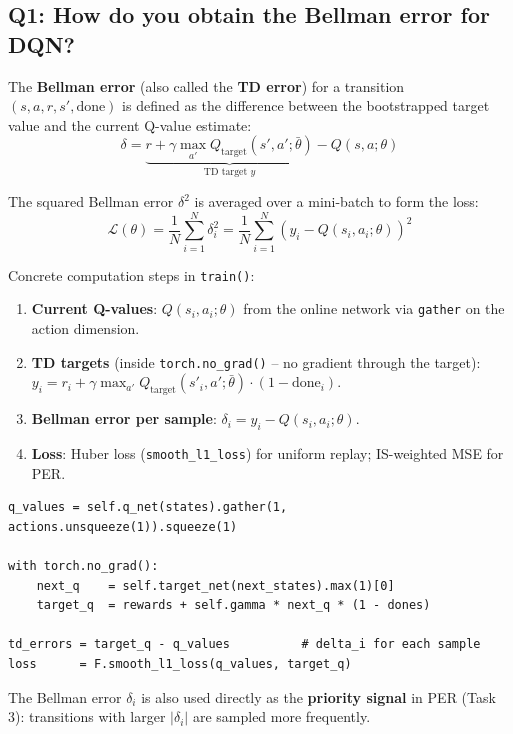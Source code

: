 \documentclass[12pt, a4paper]{report}
\begin{document}
\subsection*{Q1: How do you obtain the Bellman error for DQN?}

The \textbf{Bellman error} (also called the \textbf{TD error}) for a transition $(s,a,r,s',\text{done})$
is defined as the difference between the bootstrapped target value and the current Q-value estimate:
\[
  \delta = \underbrace{r + \gamma \max_{a'} Q_\text{target}(s',a';\bar{\theta})}_{\text{TD target }y}
           - Q(s,a;\theta)
\]

The squared Bellman error $\delta^2$ is averaged over a mini-batch to form the loss:
\[
  \mathcal{L}(\theta) = \frac{1}{N}\sum_{i=1}^{N}\delta_i^2
  = \frac{1}{N}\sum_{i=1}^{N}\!\left(y_i - Q(s_i,a_i;\theta)\right)^2
\]

Concrete computation steps in \texttt{train()}:
\begin{enumerate}
  \item \textbf{Current Q-values}: $Q(s_i,a_i;\theta)$ from the online network via \texttt{gather}
        on the action dimension.
  \item \textbf{TD targets} (inside \texttt{torch.no\_grad()} -- no gradient through the target):
        $y_i = r_i + \gamma \max_{a'} Q_\text{target}(s'_i,a';\bar{\theta})\cdot(1-\text{done}_i)$.
  \item \textbf{Bellman error per sample}: $\delta_i = y_i - Q(s_i,a_i;\theta)$.
  \item \textbf{Loss}: Huber loss (\texttt{smooth\_l1\_loss}) for uniform replay; IS-weighted MSE
        for PER.
\end{enumerate}

\begin{lstlisting}[caption={Bellman error computation in train().}]
q_values = self.q_net(states).gather(1, actions.unsqueeze(1)).squeeze(1)

with torch.no_grad():
    next_q    = self.target_net(next_states).max(1)[0]
    target_q  = rewards + self.gamma * next_q * (1 - dones)

td_errors = target_q - q_values          # delta_i for each sample
loss      = F.smooth_l1_loss(q_values, target_q)
\end{lstlisting}

The Bellman error $\delta_i$ is also used directly as the \textbf{priority signal} in PER (Task 3):
transitions with larger $|\delta_i|$ are sampled more frequently.
\end{document}
